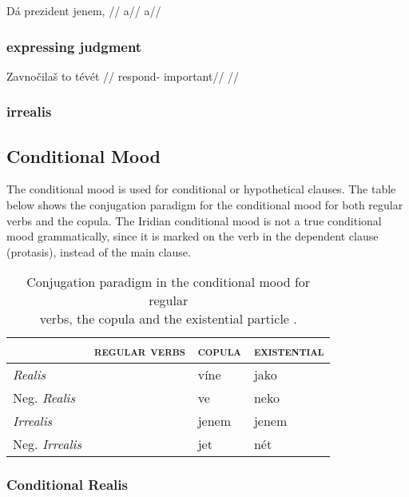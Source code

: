 \pex
\begingl
\gla Dá prezident jenem, //
\glb a//
\glft a//
\endgl
\xe

\subsubsection{expressing judgment}

\pex
\begingl
\gla Zavno\v{c}ila\v{s} to t\'ev\'et //
\glb respond-  important//
\glft {}//
\endgl
\xe

\subsubsection{irrealis}

\subsection{Conditional Mood}\label{sec:conditional}
\par The conditional mood is used for conditional or hypothetical clauses. The table below shows the conjugation paradigm for the conditional mood for both regular verbs and the copula. The Iridian conditional mood is not a true conditional mood grammatically, since it is marked on the verb in the dependent clause (protasis), instead of the main clause.

\begin{table}[h!]
	\footnotesize\sffamily
	\caption{Conjugation paradigm in the conditional mood for regular \\verbs, the copula and the existential particle .}
	\begin{tabu} to 0.8 \textwidth	{Y[1.3]Y[1.3]YY}
		\toprule
		&{\scshape regular verbs} & {\scshape copula} & {\scshape existential}\\
		\midrule

		\textit{Realis} 				& &v\'ine & jako\\
		Neg. \textit{Realis}		&&ve&neko\\

		\textit{Irrealis} 			& & jenem & jenem\\
		Neg. \textit{Irrealis} 	& & jet & n\'et\\
		\bottomrule
	\end{tabu}
\end{table}

\subsubsection{Conditional Realis}

